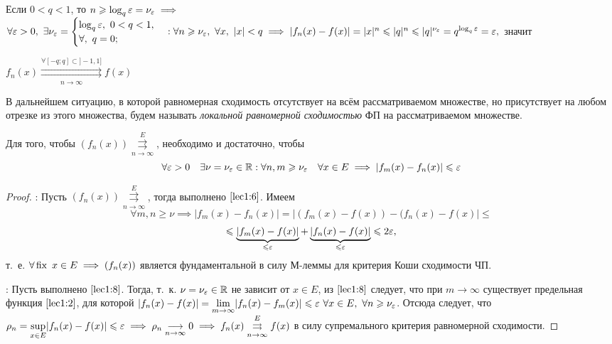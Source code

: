 \documentclass[../../main.tex]{subfiles}
\begin{document}
\begin{exmps}
\begin{enumerate}
Если $0 < q < 1$, то $n \geqslant \log_q\varepsilon = \nu_\varepsilon \implies$
$\forall \eps > 0,\ \exists \nu_\eps = 
\begin{cases}
	\log_q \eps,\ 0 < q < 1, \\
	\forall,\ q = 0;
\end{cases} : \forall n \geq \nu_\eps,\ \forall x,\ |x| < q \implies 
|f_n(x) - f(x)| = |x|^n \leq |q|^n \leq |q|^{\nu_\eps} = 
q^{\log_q \eps} = \eps,$ значит

$f_n(x) \overset{\forall [-q;q] \subset ]-1,1]}
{\underset{n \to \infty}\rightrightarrows} f(x)$
\end{enumerate}

\end{exmps}	

В дальнейшем ситуацию, в которой равномерная сходимость отсутствует на всём 
рассматриваемом множестве, но присутствует на любом отрезке из этого множества,
будем называть \emph{локальной равномерной сходимостью} ФП на
рассматриваемом множестве.

\begin{thm}
Для того, чтобы $(f_n(x)) \overset{E}
{\underset{n \to \infty}\rightrightarrows}$, необходимо и достаточно, 
чтобы 
\begin{equation}
\label{lec1:8}
\forall \varepsilon > 0 \quad \exists \nu=\nu_\varepsilon \in \mathbb{R} :
\forall n,m \geqslant \nu_\varepsilon \quad \forall x \in E \implies 
|f_m(x) - f_n(x)| \leqslant \varepsilon
\end{equation}
\end{thm}	

\begin{proof}
\;

\nec: Пусть $(f_n(x)) \overset{E}
{\underset{n \to \infty}\rightrightarrows}$, тогда выполнено $\eqref{lec1:6}$. 
Имеем
\[\forall m, n \geq \nu \implies |f_m(x) - f_n(x)| = 
|(f_m(x) - f(x)) - (f_n(x) - f(x)| \leq \]
\[ \leqslant \underbrace{|f_m(x) - f(x)|}_{\leqslant \varepsilon} + 
\underbrace{|f_n(x) - f(x)|}_{\leqslant \varepsilon} \leqslant 2\varepsilon,\] т.~е. 
$\forall \operatorname{fix} \ x \in E \implies (f_n(x))$ 
является фундаментальной в силу М-леммы для критерия Коши сходимости ЧП.

\suff: Пусть выполнено $\eqref{lec1:8}$. Тогда, т.~к. 
$\nu=\nu_\varepsilon \in \mathbb{R}$ не зависит от $x \in E$, из $\eqref{lec1:8}$
следует, что при $m \to \infty$ существует предельная функция 
$\eqref{lec1:2}$, для которой $|f_n(x) - f(x)| = 
\underset{m \to \infty}{\lim} |f_n(x) - f_m(x)| \leq  \eps \ 
\forall x \in E,\ \forall n \geq \nu_\eps$. Отсюда следует, что
$\rho_n = \underset{x \in E}{\sup} |f_n(x) - f(x)| \leqslant \varepsilon \implies 
\rho_n \underset{n \to \infty}{\longrightarrow} 0 \implies
f_n(x) \overset{E}
{\underset{n \to \infty}\rightrightarrows} f(x)$
в силу супремального критерия равномерной сходимости. 
\end{proof}	
\end{document}

